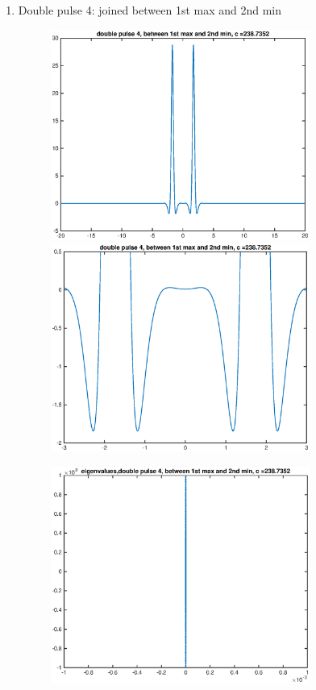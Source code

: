 \documentclass[12pt]{article}
\begin{document}
\begin{enumerate}
	\item Double pulse 4: joined between 1st max and 2nd min
	\begin{figure}[H]
	\includegraphics[width=8.5cm]{1double4.eps}
	\includegraphics[width=8.5cm]{1double4zoom.eps}
	\end{figure}
	\begin{figure}[H]
	\includegraphics[width=8.5cm]{1double4eig.eps}
	\end{figure}

\end{enumerate}
\end{document}
